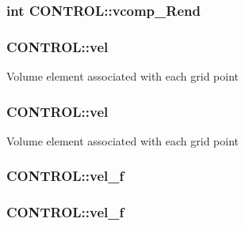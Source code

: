 \hypertarget{struct_c_o_n_t_r_o_l_a2089cab4beb75e26f6c3198f5fe3fdd4}{
\subsubsection[{vcomp\-\_\-\-Rend}]{\setlength{\rightskip}{0pt plus 5cm}int C\-O\-N\-T\-R\-O\-L\-::vcomp\-\_\-\-Rend}}\label{struct_c_o_n_t_r_o_l_a2089cab4beb75e26f6c3198f5fe3fdd4}
\hypertarget{struct_c_o_n_t_r_o_l_a36a89e018465d38f1e688f3241ce3e30}{
\subsubsection[{vel}]{ C\-O\-N\-T\-R\-O\-L\-::vel}}\label{struct_c_o_n_t_r_o_l_a36a89e018465d38f1e688f3241ce3e30}
Volume element associated with each grid point \hypertarget{struct_c_o_n_t_r_o_l_a49a63336e3da84066ba9751579242e38}{
\subsubsection[{vel}]{ C\-O\-N\-T\-R\-O\-L\-::vel}}\label{struct_c_o_n_t_r_o_l_a49a63336e3da84066ba9751579242e38}
Volume element associated with each grid point \hypertarget{struct_c_o_n_t_r_o_l_a048796a0f6d3c4bc75a8c5b14a1f9577}{
\subsubsection[{vel\-\_\-f}]{ C\-O\-N\-T\-R\-O\-L\-::vel\-\_\-f}}\label{struct_c_o_n_t_r_o_l_a048796a0f6d3c4bc75a8c5b14a1f9577}
\hypertarget{struct_c_o_n_t_r_o_l_a828141a0a0d8e10c6e109f8754897de9}{
\subsubsection[{vel\-\_\-f}]{ C\-O\-N\-T\-R\-O\-L\-::vel\-\_\-f}}\label{struct_c_o_n_t_r_o_l_a828141a0a0d8e10c6e109f8754897de9}
